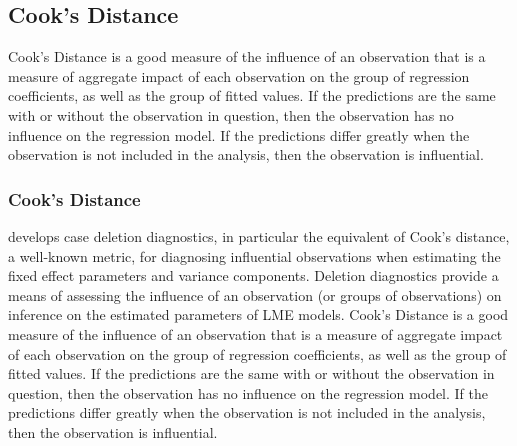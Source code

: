 \documentclass[12pt, a4paper]{report}
\theoremstyle{plain}
\theoremstyle{definition}
\theoremstyle{remark}
\begin{document}
	
	
	
	
	


	\subsection{Cook's Distance}
	
	Cook's Distance is a good measure of the influence of an observation that is a measure of aggregate impact of each observation on the group of regression coefficients, as well as the group of fitted values.
	If the predictions are the same with or without the observation in question, then the observation has no influence on the regression model. If the predictions differ greatly when the observation is not included in the analysis, then the observation is influential.
	
	
	
	
	
	

	\subsubsection{Cook's Distance}
	\citet{Christensen} develops  case deletion diagnostics, in particular the equivalent of  Cook's distance, a well-known metric, for diagnosing influential observations when estimating the fixed effect parameters and variance components. Deletion diagnostics provide a means of assessing the influence of an observation (or groups of observations) on inference on the estimated parameters of LME models. 
	Cook's Distance is a good measure of the influence of an observation that is a measure of aggregate impact of each observation on the group of regression coefficients, as well as the group of fitted values.
	If the predictions are the same with or without the observation in question, then the observation has no influence on the regression model. If the predictions differ greatly when the observation is not included in the analysis, then the observation is influential.
	
\end{document}
